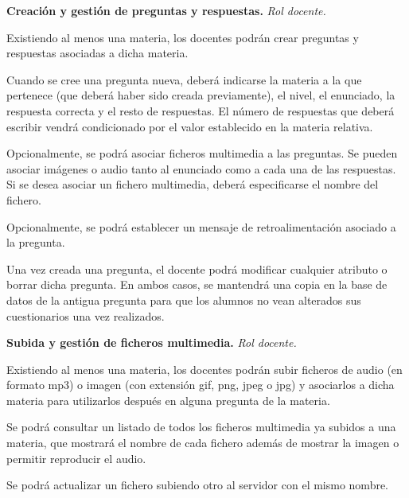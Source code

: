 \begin{rf0}
	\item \textbf{Creación y gestión de preguntas y respuestas.} \textit{Rol docente.} 
		\begin{rf0*}
			\item Existiendo al menos una materia, los docentes podrán crear preguntas y respuestas asociadas a dicha materia.
			\item Cuando se cree una pregunta nueva, deberá indicarse la materia a la que pertenece (que deberá haber sido creada previamente), el nivel, el enunciado, la respuesta correcta y el resto de respuestas. El número de respuestas que deberá escribir vendrá condicionado por el valor establecido en la materia relativa.
			\item Opcionalmente, se podrá asociar ficheros multimedia a las preguntas. Se pueden asociar imágenes o audio tanto al enunciado como a cada una de las respuestas. Si se desea asociar un fichero multimedia, deberá especificarse el nombre del fichero.
			\item Opcionalmente, se podrá establecer un mensaje de retroalimentación asociado a la pregunta.
			\item Una vez creada una pregunta, el docente podrá modificar cualquier atributo o borrar dicha pregunta. En ambos casos, se mantendrá una copia en la base de datos de la antigua pregunta para que los alumnos no vean alterados sus cuestionarios una vez realizados.
		\end{rf0*}
	
	\item \textbf{Subida y gestión de ficheros multimedia.} \textit{Rol docente.} 
		\begin{rf0*}
			\item Existiendo al menos una materia, los docentes podrán subir ficheros de audio (en formato mp3) o imagen (con extensión gif, png, jpeg o jpg) y asociarlos a dicha materia para utilizarlos después en alguna pregunta de la materia.
			\item Se podrá consultar un listado de todos los ficheros multimedia ya subidos a una materia, que mostrará el nombre de cada fichero además de mostrar la imagen o permitir reproducir el audio.
			\item Se podrá actualizar un fichero subiendo otro al servidor con el mismo nombre.
		\end{rf0*}


\end{rf0}
